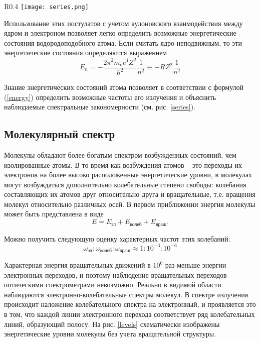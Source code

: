 \documentclass{physlab}
\begin{document}
\begin{wrapfigure}[14]{R}{0.4\lw}
\label{series}
\centering
    \texttt{[image: series.png]}
\caption{Уровни энергии атома водорода и образование спектральных серий}
\end{wrapfigure}

Использование этих постулатов с учетом кулоновского взаимодействия между ядром и электроном позволяет легко определить возможные энергетические состояния водородоподобного атома. Если считать ядро неподвижным, то эти энергетические состояния определяются выражением 
\begin{equation} \label{energy}
E_n = - \frac{2 \pi^2 m_e e^4 Z^2}{h^2} \frac{1}{n^2} \equiv -RZ^2 \frac{1}{n^2}
\end{equation}

Знание энергетических состояний атома позволяет в соответствии с формулой (\ref{energy}) определить возможные частоты его излучения и объяснить наблюдаемые спектральные  закономерности (см. рис. \ref{series}). 

\subsection{Молекулярный спектр}
Молекулы обладают более богатым спектром возбужденных состояний, чем изолированные атомы. В то время как возбуждения атомов -- это переходы их электронов на более высоко расположенные энергетические уровни, в молекулах могут возбуждаться дополнительно колебательные степени свободы: колебания составляющих их атомов друг относительно друга и вращательные, т.е. вращения молекул относительно различных осей. В первом приближении энергия молекулы может быть представлена в виде 
\begin{equation}
E = E_\text{эл} + E_\text{колеб} + E_\text{вращ}.
\end{equation}

Можно получить следующую оценку характерных частот этих колебаний:
\begin{equation}
\omega_\text{эл} : \omega_\text{колеб} : \omega_\text{вращ} \approx 1 : 10^{-3} : 10^{-6}
\end{equation}

Характерная энергия вращательных движений в $10^6$ раз меньше энергии электронных переходов, и поэтому наблюдение вращательных переходов оптическими спектрометрами невозможно. Реально в видимой области наблюдаются электронно-колебательные спектры молекул. В спектре излучения происходит наложение колебательного спектра на электронный, и проявляется это в том, что каждой линии электронного перехода соответствует ряд колебательных линий, образующий полосу. На рис. \ref{levels} схематически изображены энергетические уровни молекулы без учета вращательной структуры.
\end{document}
